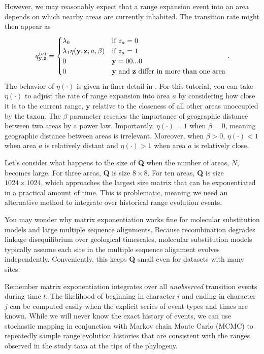\documentclass[11pt]{article}
\begin{document}
However, we may reasonably expect that a range expansion event into an area depends on which nearby areas are currently inhabited.
The transition rate might then appear as
\[
q^{(a)}_{\textbf{y},\textbf{z}} =
\begin{cases}
\lambda_0 & \text{if $z_a=0$}  \\
\lambda_1 \eta(\textbf{y}, \textbf{z}, a, \beta) & \text{if $z_a=1$} \\
0 & \mathbf{y} = 00...0 \\
0 & \text{\textbf{y} and \textbf{z} differ in more than one area}
\end{cases}.
\]
The behavior of $\eta(\cdot)$ is given in finer detail in \citet{landis13}.
For this tutorial, you can take $\eta(\cdot)$ to adjust the rate of range expansion into area $a$ by considering how close it is to the current range, $\textbf{y}$ relative to the closeness of all other areas unoccupied by the taxon.
The $\beta$ parameter rescales the importance of geographic distance between two areas by a power law.
Importantly, $\eta(\cdot) = 1$ when $\beta=0$, meaning geographic distance between areas is irrelevant.
Moreover, when $\beta > 0$, $\eta(\cdot) < 1$ when area $a$ is relatively distant and $\eta(\cdot) > 1$ when area $a$ is relatively close.

Let's consider what happens to the size of \textbf{Q} when the number of areas, $N$, becomes large.
For three areas, \textbf{Q} is size $8 \times 8$.
For ten areas, \textbf{Q} is size $1024 \times 1024$, which approaches the largest size matrix that can be exponentiated in a practical amount of time.
This is problematic, meaning we need an alternative method to integrate over historical range evolution events.

You may wonder why matrix exponentiation works fine for molecular substitution models and large multiple sequence alignments.
Because recombination degrades linkage disequilibrium over geological timescales, molecular substitution models typically assume each site in the multiple sequence alignment evolves independently.
Conveniently, this keeps \textbf{Q} small even for datasets with many sites.

Remember matrix exponentiation integrates over all \textit{unobserved} transition events during time $t$.
The likelihood of beginning in character $i$ and ending in character $j$ can be computed easily when the explicit series of event types and times are known.
While we will never know the exact history of events, we can use stochastic mapping in conjunction with Markov chain Monte Carlo (MCMC) to repeatedly sample range evolution histories that are consistent with the ranges observed in the study taxa at the tips of the phylogeny.
\end{document}
